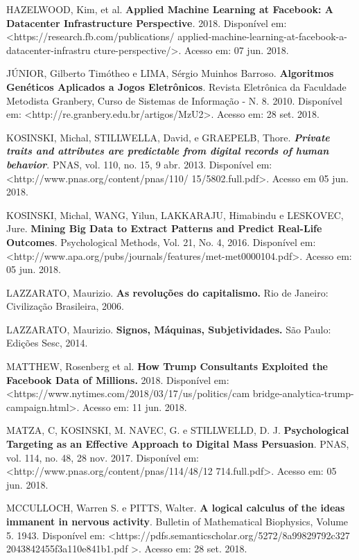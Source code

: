 HAZELWOOD, Kim, et al. \textbf{Applied Machine Learning at Facebook: A
Datacenter Infrastructure Perspective}\emph{.} 2018. Disponível em:
\textless{}https://research.fb.com/publications/
applied-machine-learning-at-facebook-a-datacenter-infrastru
cture-perspective/\textgreater{}.
Acesso em: 07 jun. 2018.

JÚNIOR, Gilberto Timótheo e LIMA, Sérgio Muinhos Barroso.
\textbf{Algoritmos Genéticos Aplicados a Jogos Eletrônicos}. Revista
Eletrônica da Faculdade Metodista Granbery, Curso de Sistemas de
Informação - N. 8. 2010. Disponível em:
\textless{}http://re.granbery.edu.br/artigos/MzU2\textgreater{}. Acesso
em: 28 set. 2018.

KOSINSKI, Michal, STILLWELLA, David, e GRAEPELB, Thore.
\emph{\textbf{Private traits and attributes are predictable from digital
records of human behavior}}. PNAS, vol. 110, no. 15, 9 abr. 2013.
Disponível em:
\textless{}http://www.pnas.org/content/pnas/110/
15/5802.full.pdf\textgreater{}.
Acesso em 05 jun. 2018.

KOSINSKI, Michal, WANG, Yilun, LAKKARAJU, Himabindu e LESKOVEC, Jure.
\textbf{Mining Big Data to Extract Patterns and Predict Real-Life
Outcomes}. Psychological Methods, Vol. 21, No. 4, 2016. Disponível em:
\textless{}http://www.apa.org/pubs/journals/features/met-met0000104.pdf\textgreater{}.
Acesso em: 05 jun. 2018.

LAZZARATO, Maurizio. \textbf{As revoluções do capitalismo.} Rio de
Janeiro: Civilização Brasileira, 2006.

LAZZARATO, Maurizio. \textbf{Signos, Máquinas, Subjetividades.} São
Paulo: Edições Sesc, 2014.

MATTHEW, Rosenberg et al. \textbf{How Trump Consultants Exploited the
Facebook Data of Millions.} 2018. Disponível em:
\textless{}https://www.nytimes.com/2018/03/17/us/politics/cam
bridge-analytica-trump-campaign.html\textgreater{}.
Acesso em: 11 jun. 2018.

MATZA, C, KOSINSKI, M. NAVEC, G. e STILLWELLD, D. J.
\textbf{Psychological Targeting as an Effective Approach to Digital Mass
Persuasion}. PNAS, vol. 114, no. 48, 28 nov. 2017. Disponível em:
\textless{}http://www.pnas.org/content/pnas/114/48/12
714.full.pdf\textgreater{}.
Acesso em: 05 jun. 2018.

MCCULLOCH, Warren S. e PITTS, Walter. \textbf{A logical calculus of the
ideas immanent in nervous activity}. Bulletin of Mathematical
Biophysics, Volume 5. 1943. Disponível em:
\textless{}https://pdfs.semanticscholar.org/5272/8a99829792c327
2043842455f3a110e841b1.pdf
\textgreater{}. Acesso em: 28 set. 2018.

